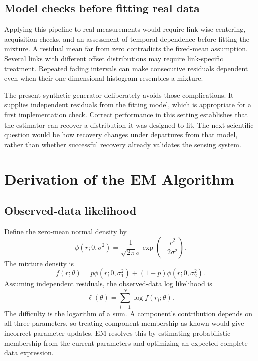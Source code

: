 \documentclass[conference,letterpaper]{IEEEtran}
\begin{document}
\subsection{Model checks before fitting real data}
Applying this pipeline to real measurements would require link-wise centering, acquisition checks, and an assessment of temporal dependence before fitting the mixture. A residual mean far from zero contradicts the fixed-mean assumption. Several links with different offset distributions may require link-specific treatment. Repeated fading intervals can make consecutive residuals dependent even when their one-dimensional histogram resembles a mixture.

The present synthetic generator deliberately avoids those complications. It supplies independent residuals from the fitting model, which is appropriate for a first implementation check. Correct performance in this setting establishes that the estimator can recover a distribution it was designed to fit. The next scientific question would be how recovery changes under departures from that model, rather than whether successful recovery already validates the sensing system.

\section{Derivation of the EM Algorithm}
\label{sec:em}
\subsection{Observed-data likelihood}
Define the zero-mean normal density by
\begin{equation}
\phi(r;0,\sigma^2)=\frac{1}{\sqrt{2\pi}\sigma}
\exp\left(-\frac{r^2}{2\sigma^2}\right).
\end{equation}
The mixture density is
\begin{equation}
f(r;\theta)=p\phi(r;0,\sigma_1^2)+(1-p)\phi(r;0,\sigma_2^2).
\label{eq:mixture}
\end{equation}
Assuming independent residuals, the observed-data log likelihood is
\begin{equation}
\ell(\theta)=\sum_{i=1}^{N}\log f(r_i;\theta).
\label{eq:ll}
\end{equation}
The difficulty is the logarithm of a sum. A component's contribution depends on all three parameters, so treating component membership as known would give incorrect parameter updates. EM resolves this by estimating probabilistic membership from the current parameters and optimizing an expected complete-data expression.
\end{document}
